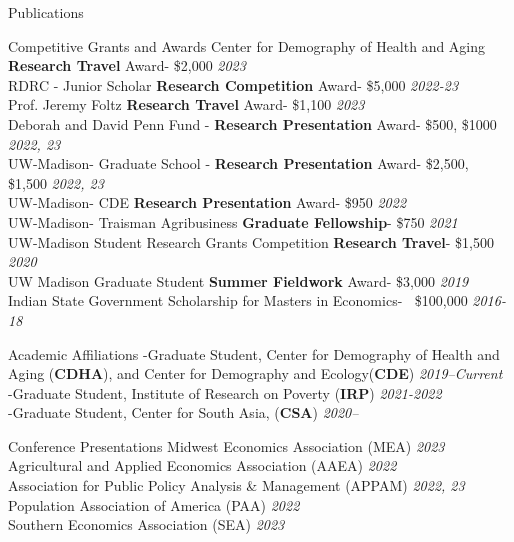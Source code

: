 \documentclass{resume} %
\begin{document}
\begin{rSection}{Publications}
\begin{rSection}{Competitive Grants and Awards}
Center for Demography of Health and Aging \textbf{Research Travel} Award- \$2,000 \hfill \textit{2023}	\\
RDRC - Junior Scholar \textbf{Research Competition} Award- \$5,000 \hfill \textit{2022-23}	\\
Prof. Jeremy Foltz \textbf{Research Travel} Award- \$1,100 \hfill \textit{2023}	\\
Deborah and David Penn Fund - \textbf{Research Presentation} Award- \$500, \$1000 \hfill \textit{2022, 23}	\\
UW-Madison- Graduate School - \textbf{Research Presentation} Award- \$2,500, \$1,500 \hfill \textit{2022, 23}	\\
UW-Madison- CDE \textbf{Research Presentation} Award- \$950 \hfill \textit{2022} \\
UW-Madison- Traisman Agribusiness \textbf{Graduate Fellowship}- \$750 \hfill \textit{2021}	\\
UW-Madison Student Research Grants Competition \textbf{Research Travel}- \$1,500 \hfill \textit{2020}  \\
UW Madison Graduate Student \textbf{Summer Fieldwork} Award- \$3,000  \hfill \textit{2019}\\
Indian State Government Scholarship for Masters in Economics- $~$ \$100,000 \hfill \textit{2016-18}

\end{rSection}

\begin{rSection}{Academic Affiliations}
-Graduate Student, Center for Demography of Health and Aging (\textbf{CDHA}), and Center for Demography and Ecology(\textbf{CDE})
 \hfill \textit{2019--Current}\\
-Graduate Student, Institute of Research on Poverty (\textbf{IRP})%
 \hfill \textit{2021-2022}\\
 -Graduate Student, Center for South Asia, (\textbf{CSA})%
 \hfill \textit{2020--}
\end{rSection}




\begin{rSection}{Conference Presentations} 
	Midwest Economics Association (MEA) {\hfill \em 2023}\\
	Agricultural and Applied Economics Association (AAEA) {\hfill \em 2022}\\
	Association for Public Policy Analysis \& Management (APPAM) {\hfill \em 2022, 23} \\
	Population Association of America (PAA) {\hfill \em 2022} \\
	Southern Economics Association (SEA) {\hfill \em 2023} 






\end{rSection}
\end{rSection}
\end{document}

